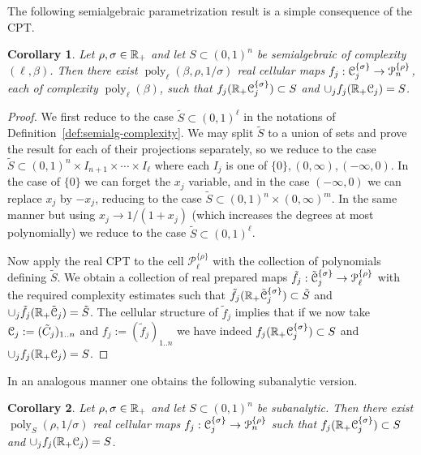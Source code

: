 \documentclass[reqno]{amsart}
\newtheorem{Cor}{Corollary}{\bfseries}{\itshape}
\renewcommand\~[1]{\widetilde{#1}}
\def\poly{\operatorname{poly}} \def\J{\operatorname{J}}
\def\cP{{\mathcal P}} \def\cR{{\mathcal R}}
\def\he#1{{\{#1\}}}
\def\hrho{{\he\rho}}
\def\hsigma{{\he\sigma}}
\begin{document}
The following semialgebraic parametrization result is a simple
consequence of the CPT.

\begin{Cor}\label{cor:cpt-semialg}
  Let $\rho,\sigma\in{\mathbb R}_+$ and let $S\subset(0,1)^n$ be semialgebraic
  of complexity $(\ell,\beta)$. Then there exist
  $\poly_\ell(\beta,\rho,1/\sigma)$ real cellular maps
  $f_j:\cC^\hsigma_j\to\cP_n^\hrho$, each of complexity
  $\poly_\ell(\beta)$, such that $f_j(\R_+\cC_j^\hsigma)\subset S$ and
  $\cup_j f_j({\mathbb R}_+{\mathcal C}_j)=S$.
\end{Cor}

\begin{proof}
  We first reduce to the case $\tilde S\subset(0,1)^\ell$ in the
  notations of Definition~\ref{def:semialg-complexity}. We may split
  $\tilde S$ to a union of sets and prove the result for each of their
  projections separately, so we reduce to the case
  $\tilde S\subset(0,1)^n\times I_{n+1}\times\cdots\times I_\ell$
  where each $I_j$ is one of $\{0\},(0,\infty),(-\infty,0)$. In the
  case of $\{0\}$ we can forget the $x_j$ variable, and in the case
  $(-\infty,0)$ we can replace $x_j$ by $-x_j$, reducing to the case
  $\tilde S\subset(0,1)^n\times(0,\infty)^m$. In the same manner but
  using $x_j\to1/(1+x_j)$ (which increases the degrees at most
  polynomially) we reduce to the case $\tilde S\subset(0,1)^\ell$.

  Now apply the real CPT to the cell $\cP_\ell^\hrho$ with the
  collection of polynomials defining $\tilde S$. We obtain a
  collection of real prepared maps
  $\tilde f_j:\tilde \cC^\hsigma_j\to\cP_\ell^\hrho$ with the required
  complexity estimates such that
  $\tilde f_j(\R_+\tilde\cC_j^\hsigma)\subset \tilde S$ and
  $\cup_j \tilde f_j({\mathbb R}_+\tilde{{\mathcal C}}_j)=\tilde S$. The cellular
  structure of $\tilde f_j$ implies that if we now take
  ${\mathcal C}_j:=(\tilde C_j)_{1..n}$ and $f_j:=(\tilde f_j)_{1..n}$ we have
  indeed $f_j(\R_+\cC_j^\hsigma)\subset S$ and
  $\cup_j f_j({\mathbb R}_+{\mathcal C}_j)=S$.
\end{proof}

In an analogous manner one obtains the following subanalytic version.

\begin{Cor}\label{cor:cpt-subanalytic}
  Let $\rho,\sigma\in{\mathbb R}_+$ and let $S\subset(0,1)^n$ be
  subanalytic. Then there exist $\poly_S(\rho,1/\sigma)$ real
  cellular maps $f_j:\cC^\hsigma_j\to\cP_n^\hrho$ such that
  $f_j(\R_+\cC_j^\hsigma)\subset S$ and $\cup_j f_j({\mathbb R}_+{\mathcal C}_j)=S$.
\end{Cor}
\end{document}
